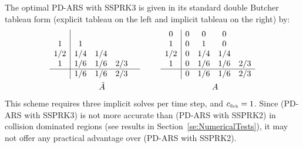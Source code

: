 The optimal PD-ARS with SSPRK3 is given in its standard double Butcher tableau form (explicit tableau on the left and implicit tableau on the right) by:
\begin{align}
  &\begin{array}{c | c c c c}
  	    &     &     &     &  \\
  	 1  & 1   &     &     &  \\
  	1/2 & 1/4 & 1/4 &  \\
  	 1  & 1/6 & 1/6 & 2/3 &  \\ \hline
  	    & 1/6 & 1/6 & 2/3 &
  \end{array}
  \qquad
  \begin{array}{c | c c c c}
  	0 & 0 & 0            & 0            \\
  	1 & 0 & 1            & 0            \\
  	1/2 & 0 & 1/4 & 1/4 \\ 
  	1 & 0 & 1/6 & 1/6 & 2/3\\\hline
  	  & 0 & 1/6 & 1/6 & 2/3
  \end{array}\\ 
    &\hspace{60pt} \tilde{A} \hspace{130pt} A
\end{align}
This scheme requires three implicit solves per time step, and $c_{\mbox{\tiny Sch}}= 1$.  
Since (PD-ARS with SSPRK3) is not more accurate than (PD-ARS with SSPRK2) in collision dominated regions (see results in Section~\ref{se:NumericalTests}), it may not offer any practical advantage over (PD-ARS with SSPRK2).  

